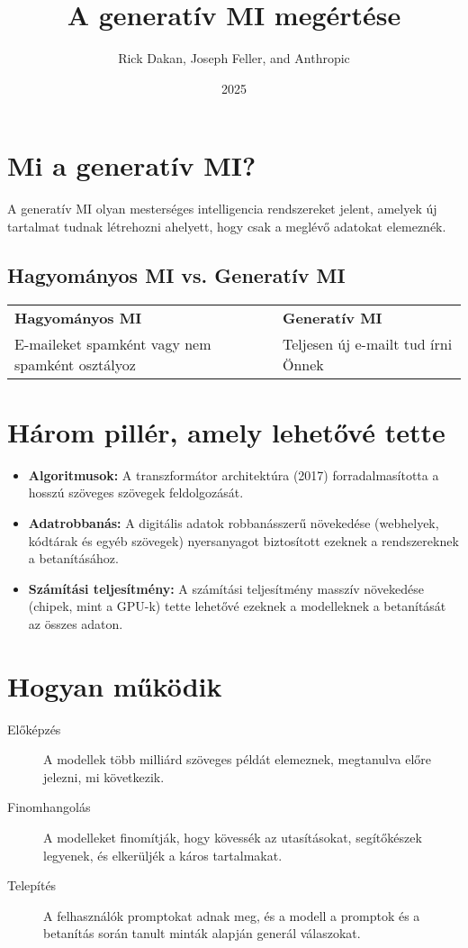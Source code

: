 \documentclass[a4paper, 12pt]{article}
\begin{document}
\title{A generatív MI megértése}
\author{Rick Dakan, Joseph Feller, and Anthropic}
\date{2025}
\maketitle

\section*{Mi a generatív MI?}
A generatív MI olyan mesterséges intelligencia rendszereket jelent, amelyek új tartalmat tudnak létrehozni ahelyett, hogy csak a meglévő adatokat elemeznék.

\subsection*{Hagyományos MI vs. Generatív MI}
\begin{tabular}{ll}
\textbf{Hagyományos MI} & \textbf{Generatív MI} \\
E-maileket spamként vagy nem spamként osztályoz & Teljesen új e-mailt tud írni Önnek \\
\end{tabular}

\section*{Három pillér, amely lehetővé tette}
\begin{itemize}
    \item \textbf{Algoritmusok:} A transzformátor architektúra (2017) forradalmasította a hosszú szöveges szövegek feldolgozását.
    \item \textbf{Adatrobbanás:} A digitális adatok robbanásszerű növekedése (webhelyek, kódtárak és egyéb szövegek) nyersanyagot biztosított ezeknek a rendszereknek a betanításához.
    \item \textbf{Számítási teljesítmény:} A számítási teljesítmény masszív növekedése (chipek, mint a GPU-k) tette lehetővé ezeknek a modelleknek a betanítását az összes adaton.
\end{itemize}

\section*{Hogyan működik}
\begin{description}
    \item[Előképzés] A modellek több milliárd szöveges példát elemeznek, megtanulva előre jelezni, mi következik.
    \item[Finomhangolás] A modelleket finomítják, hogy kövessék az utasításokat, segítőkészek legyenek, és elkerüljék a káros tartalmakat.
    \item[Telepítés] A felhasználók promptokat adnak meg, és a modell a promptok és a betanítás során tanult minták alapján generál válaszokat.
\end{description}
\end{document}
